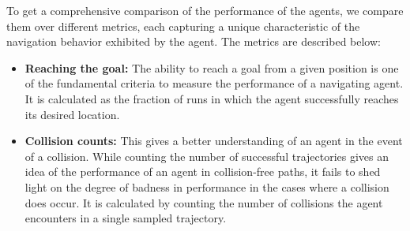 To get a comprehensive comparison of the performance of the agents, we compare them over different metrics, each capturing a unique characteristic of the navigation behavior exhibited by the agent. The metrics are described below:
\begin{itemize}
        \item \textbf{Reaching the goal:} The ability to reach a goal from a given position is one of the fundamental criteria to measure the performance of a navigating agent. It is calculated as the fraction of runs in which the agent successfully reaches its desired location.        
        
        \item \textbf{Collision counts:} This gives a better understanding of an agent in the event of a collision. While counting the number of successful trajectories gives an idea of the performance of an agent in collision-free paths, it fails to shed light on the degree of badness in performance in the cases where a collision does occur. It is calculated by counting the number of collisions the agent encounters in a single sampled trajectory.
        


\end{itemize}
